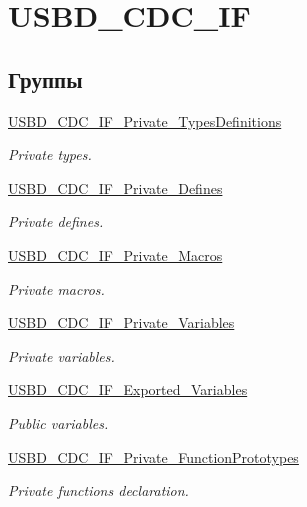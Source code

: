 \hypertarget{group___u_s_b_d___c_d_c___i_f}{
\section{USBD\_\-CDC\_\-IF}
\label{group___u_s_b_d___c_d_c___i_f}
}
\subsection*{Группы}
\begin{CompactItemize}
\item 
\hyperlink{group___u_s_b_d___c_d_c___i_f___private___types_definitions}{USBD\_\-CDC\_\-IF\_\-Private\_\-TypesDefinitions}
\begin{CompactList}\small\item\em Private types. \item\end{CompactList}

\item 
\hyperlink{group___u_s_b_d___c_d_c___i_f___private___defines}{USBD\_\-CDC\_\-IF\_\-Private\_\-Defines}
\begin{CompactList}\small\item\em Private defines. \item\end{CompactList}

\item 
\hyperlink{group___u_s_b_d___c_d_c___i_f___private___macros}{USBD\_\-CDC\_\-IF\_\-Private\_\-Macros}
\begin{CompactList}\small\item\em Private macros. \item\end{CompactList}

\item 
\hyperlink{group___u_s_b_d___c_d_c___i_f___private___variables}{USBD\_\-CDC\_\-IF\_\-Private\_\-Variables}
\begin{CompactList}\small\item\em Private variables. \item\end{CompactList}

\item 
\hyperlink{group___u_s_b_d___c_d_c___i_f___exported___variables}{USBD\_\-CDC\_\-IF\_\-Exported\_\-Variables}
\begin{CompactList}\small\item\em Public variables. \item\end{CompactList}

\item 
\hyperlink{group___u_s_b_d___c_d_c___i_f___private___function_prototypes}{USBD\_\-CDC\_\-IF\_\-Private\_\-FunctionPrototypes}
\begin{CompactList}\small\item\em Private functions declaration. \item\end{CompactList}

\end{CompactItemize}
